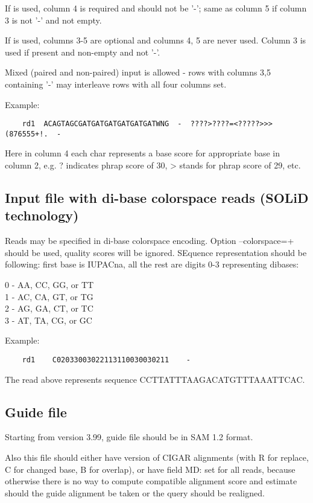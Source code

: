 \documentclass[english]{article}
\begin{document}
    If  is used, column 4 is required and should not be '-'; same as column 5 
    if column 3 is not '-' and not empty.

    If  is used, columns 3-5 are optional and columns 4, 5 are never used.
    Column 3 is used if present and non-empty and not '-'.

    Mixed (paired and non-paired) input is allowed - rows with columns 3,5 
    containing '-' may interleave rows with all four columns set.

    Example:
	\begin{verbatim}
    rd1  ACAGTAGCGATGATGATGATGATGATWNG  -  ????>????=<?????>>>(876555+!.  -
	\end{verbatim}

    Here in column 4 each char represents a base score for appropriate base in
    column 2, e.g. ? indicates phrap score of 30, > stands for phrap score of 
    29, etc.

\subsection{Input file with di-base colorspace reads (SOLiD technology)}

    Reads may be specified in di-base colorspace encoding.  Option --colorspace=+ 
    should be used, quality scores will be ignored.  SEquence representation should 
    be following: first base is IUPACna, all the rest are digits 0-3 representing 
    dibases:

    0 - AA, CC, GG, or TT\\
    1 - AC, CA, GT, or TG\\
    2 - AG, GA, CT, or TC\\
    3 - AT, TA, CG, or GC

    Example: 

	\begin{verbatim}
    rd1    C02033003022113110030030211    -
	\end{verbatim}
    
    The read above represents sequence CCTTATTTAAGACATGTTTAAATTCAC.

\subsection{Guide file}
    Starting from version 3.99, guide file should be in SAM 1.2 format. 
    
    Also this file should either have  version of CIGAR alignments
    (with R for replace, C for changed base, B for overlap), or have field MD:
    set for all reads, because otherwise there is no way to compute compatible 
    alignment score and estimate should the guide alignment be taken or the
    query should be realigned.
\end{document}
